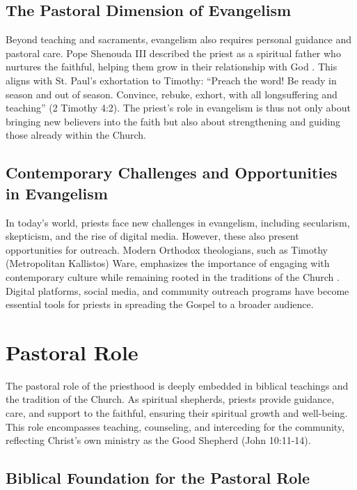 \documentclass[12pt, doc]{apa7}   	%
\begin{document}
\subsection{The Pastoral Dimension of Evangelism}

Beyond teaching and sacraments, evangelism also requires personal guidance and pastoral care. Pope Shenouda III described the priest as a spiritual father who nurtures the faithful, helping them grow in their relationship with God \citep{priesthood_shenouda}. This aligns with St. Paul’s exhortation to Timothy: “Preach the word! Be ready in season and out of season. Convince, rebuke, exhort, with all longsuffering and teaching” (2 Timothy 4:2). The priest’s role in evangelism is thus not only about bringing new believers into the faith but also about strengthening and guiding those already within the Church.

\subsection{Contemporary Challenges and Opportunities in Evangelism}

In today’s world, priests face new challenges in evangelism, including secularism, skepticism, and the rise of digital media. However, these also present opportunities for outreach. Modern Orthodox theologians, such as Timothy (Metropolitan Kallistos) Ware, emphasizes the importance of engaging with contemporary culture while remaining rooted in the traditions of the Church \citep{orthodox_church_ware}. Digital platforms, social media, and community outreach programs have become essential tools for priests in spreading the Gospel to a broader audience.


\section{Pastoral Role}\label{pastoral}

The pastoral role of the priesthood is deeply embedded in biblical teachings and the tradition of the Church. As spiritual shepherds, priests provide guidance, care, and support to the faithful, ensuring their spiritual growth and well-being. This role encompasses teaching, counseling, and interceding for the community, reflecting Christ’s own ministry as the Good Shepherd (John 10:11-14).

\subsection{Biblical Foundation for the Pastoral Role}
\end{document}
